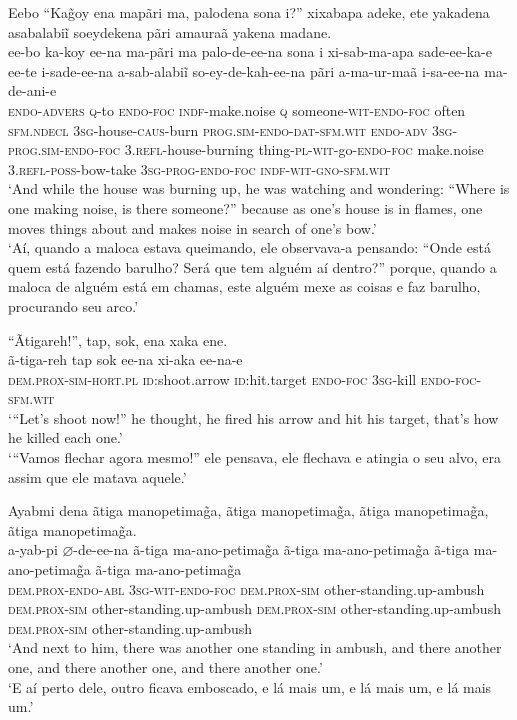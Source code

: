 \documentclass[output=paper,
modfonts,nonflat
]{langsci/langscibook}
\begin{document}
\ea Eebo “Ka\~{g}oy ena mapãri ma, palodena sona i?” xixabapa adeke, ete yakadena asabalabiĩ soeydekena pãri amauraã yakena madane.\\[.3em]
\gll ee-bo ka-koy ee-na ma-pãri ma palo-de-ee-na sona i xi-sab-ma-apa sade-ee-ka-e ee-te i-sade-ee-na a-sab-alabiĩ so-ey-de-kah-ee-na pãri a-ma-ur-maã i-sa-ee-na ma-de-ani-e\\
\textsc{endo-advers} \textsc{q}-to \textsc{endo-foc} \textsc{indf}-make.noise \textsc{q} someone-\textsc{wit-endo-foc} often \textsc{sfm.ndecl} \textsc{3sg}-house-\textsc{caus}-burn \textsc{prog.sim-endo-dat-sfm.wit} \textsc{endo-adv} \textsc{3sg-prog.sim-endo-foc} \textsc{3.refl}-house-burning thing-\textsc{pl-wit}-go-\textsc{endo-foc} make.noise \textsc{3.refl-poss}-bow-take \textsc{3sg-prog-endo-foc} \textsc{indf-wit-gno-sfm.wit}\\
\glt ‘And while the house was burning up, he was watching and wondering: “Where is one making noise, is there someone?” because as one’s house is in flames, one moves things about and makes noise in search of one’s bow.’\\
\glt ‘Aí, quando a maloca estava queimando, ele observava-a pensando: “Onde está quem está fazendo barulho? Será que tem alguém aí dentro?” porque, quando a maloca de alguém está em chamas, este alguém mexe as coisas e faz barulho, procurando seu arco.’\\
\z

\ea “Ãtigareh!”, tap, sok, ena xaka ene.\\[.3em]
\gll ã-tiga-reh tap sok ee-na xi-aka ee-na-e\\
\textsc{dem.prox-sim-hort.pl} \textsc{id}:shoot.arrow \textsc{id}:hit.target \textsc{endo-foc} \textsc{3sg}-kill \textsc{endo-foc-sfm.wit}\\
\glt ‘“Let’s shoot now!” he thought, he fired his arrow and hit his target, that’s how he killed each one.’\\
\glt ‘“Vamos flechar agora mesmo!” ele pensava, ele flechava e atingia o seu alvo, era assim que ele matava aquele.’\\
\z

\ea Ayabmi dena ãtiga manopetima\~{g}a, ãtiga manopetima\~{g}a, ãtiga manopetima\~{g}a, ãtiga manopetima\~{g}a.\\[.3em]
\gll a-yab-pi \(\varnothing\)-de-ee-na ã-tiga ma-ano-petima\~{g}a ã-tiga ma-ano-petima\~{g}a ã-tiga ma-ano-petima\~{g}a ã-tiga ma-ano-petima\~{g}a\\
\textsc{dem.prox-endo-abl} \textsc{3sg-wit-endo-foc} \textsc{dem.prox-sim} other-standing.up-ambush \textsc{dem.prox-sim} other-standing.up-ambush \textsc{dem.prox-sim} other-standing.up-ambush \textsc{dem.prox-sim} other-standing.up-ambush\\
\glt ‘And next to him, there was another one standing in ambush, and there another one, and there another one, and there another one.’{\footnotemark}\\
\glt ‘E aí perto dele, outro ficava emboscado, e lá mais um, e lá mais um, e lá mais um.’\\
\z
\end{document}
